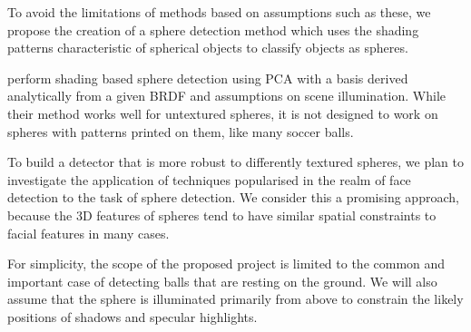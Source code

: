 \documentclass[11pt]{scrartcl}
\begin{document}
{        



        To avoid the limitations of methods based on assumptions such as
        these, we propose the creation of a sphere detection method which uses
        the shading patterns characteristic of spherical objects to classify
        objects as spheres.

        \citet{nillius2008shading} perform shading based sphere detection
        using PCA with a basis derived analytically from a given BRDF and assumptions
        on scene illumination. While their method works well for untextured spheres, it is
        not designed to work on spheres with patterns printed on them, like many
        soccer balls.

        To build a detector that is more robust to differently textured
        spheres, we plan to investigate the application of techniques
        popularised in the realm of face detection to the task of sphere
        detection. We consider this a promising approach, because the 3D
        features of spheres tend to have similar spatial constraints to facial
        features in many cases.

        For simplicity, the scope of the proposed project is limited to the
        common and important case of detecting balls that are resting on the
        ground. We will also assume that the sphere is illuminated primarily
        from above to constrain the likely positions of shadows and specular
        highlights.

}
\end{document}
